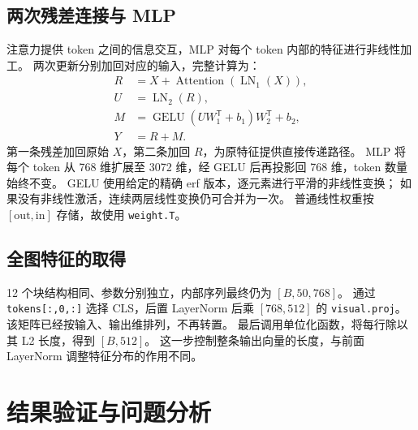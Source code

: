 \documentclass[a4paper,12pt]{article}
\begin{document}
\subsection{两次残差连接与 MLP}
注意力提供 token 之间的信息交互，MLP 对每个 token 内部的特征进行非线性加工。
两次更新分别加回对应的输入，完整计算为：
\[
\begin{aligned}
R&=X+\operatorname{Attention}(\operatorname{LN}_1(X)),\\
U&=\operatorname{LN}_2(R),\\
M&=\operatorname{GELU}(UW_1^{\mathsf T}+b_1)W_2^{\mathsf T}+b_2,\\
Y&=R+M.
\end{aligned}
\]
第一条残差加回原始 $X$，第二条加回 $R$，为原特征提供直接传递路径。
MLP 将每个 token 从 768 维扩展至 3072 维，经 GELU 后再投影回 768 维，token 数量始终不变。
GELU 使用给定的精确 erf 版本，逐元素进行平滑的非线性变换；
如果没有非线性激活，连续两层线性变换仍可合并为一次。
普通线性权重按 $[\mathrm{out},\mathrm{in}]$ 存储，故使用 \texttt{weight.T}。

\subsection{全图特征的取得}
12 个块结构相同、参数分别独立，内部序列最终仍为 $[B,50,768]$。
通过 \texttt{tokens[:,0,:]} 选择 CLS，后置 LayerNorm 后乘 $[768,512]$ 的
\texttt{visual.proj}。该矩阵已经按输入、输出维排列，不再转置。
最后调用单位化函数，将每行除以其 L2 长度，得到 $[B,512]$。
这一步控制整条输出向量的长度，与前面 LayerNorm 调整特征分布的作用不同。

\clearpage
\section{结果验证与问题分析}
\end{document}
